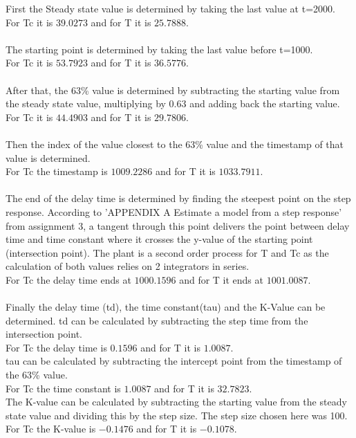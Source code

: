 First the Steady state value is determined by taking the last value at t=2000.\\
For Tc it is $39.0273 $ and for T it is $25.7888 $.\\
\\
The starting point is determined by taking the last value before t=1000.\\
For Tc it is $53.7923 $ and for T it is $36.5776 $.\\
\\
After that, the 63\% value is determined by subtracting the starting value from the steady state value, multiplying by 0.63 and adding back the starting value.\\
For Tc it is $44.4903 $ and for T it is $29.7806 $.\\
\\
Then the index of the value closest to the 63\% value and the timestamp of that value is determined.\\
For Tc the timestamp is $1009.2286 $ and for T it is $1033.7911 $.\\
\\
The end of the delay time is determined by finding the steepest point on the step response. According to 'APPENDIX A Estimate a model from a step response' from assignment 3, a tangent through this point delivers the point between delay time and time constant where it crosses the y-value of the starting point (intersection point). The plant is a second order process for T and Tc as the calculation of both values relies on 2 integrators in series.\\
For Tc the delay time ends at $1000.1596$ and for T it ends at $1001.0087$.\\
\\
Finally the delay time (td), the time constant(tau) and the K-Value can be determined. 
td can be calculated by subtracting the step time from the intersection point.\\
For Tc the delay time is $0.1596$ and for T it is $1.0087$.\\
tau can be calculated by subtracting the intercept point from the timestamp of the 63\% value.\\
For Tc the time constant is $1.0087$ and for T it is $32.7823$.\\
The K-value can be calculated by subtracting the starting value from the steady state value and dividing this by the step size. The step size chosen here was 100.
For Tc the K-value is $-0.1476$ and for T it is $-0.1078$.\\
\\

